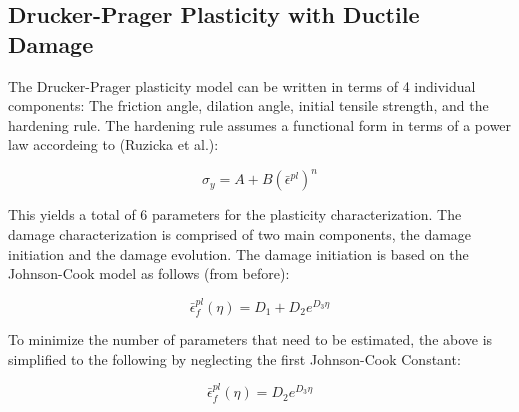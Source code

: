 \subsection{Drucker-Prager Plasticity with Ductile Damage}

The Drucker-Prager plasticity model can be written in terms of 4 individual
components: The friction angle, dilation angle, initial tensile strength,
and the hardening rule. The hardening rule assumes a functional form
in terms of a power law accordeing to (Ruzicka et al.):

\begin{equation}
\sigma_{y}=A+B\left(\bar{\epsilon}^{pl}\right)^{n}\label{eqn:param5}
\end{equation}


This yields a total of 6 parameters for the plasticity characterization.
The damage characterization is comprised of two main components, the
damage initiation and the damage evolution. The damage initiation
is based on the Johnson-Cook model as follows (from before):

\begin{equation}
\bar{\epsilon}_{f}^{pl}\left(\eta\right)=D_{1}+D_{2}e^{D_{3}\eta}\label{eqn:param6}
\end{equation}


To minimize the number of parameters that need to be estimated, the
above is simplified to the following by neglecting the first Johnson-Cook
Constant:

\begin{equation}
\bar{\epsilon}_{f}^{pl}\left(\eta\right)=D_{2}e^{D_{3}\eta}\label{eqn:param6-1}
\end{equation}
